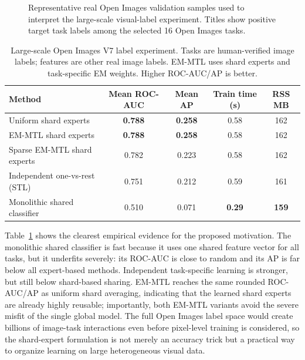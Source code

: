 \documentclass[preprint,12pt]{elsarticle}
\begin{document}
	\begin{figure}[t]
		\centering
		\caption{Representative real Open Images validation samples used to
			interpret the large-scale visual-label experiment. Titles show
			positive target task labels among the selected 16 Open Images tasks.}
		\label{fig:openimages_examples}
	\end{figure}

	\begin{table}[t]
		\centering
		\caption{Large-scale Open Images V7 label experiment. Tasks are
			human-verified image labels; features are other real image labels.
			EM-MTL uses shard experts and task-specific EM weights. Higher
			ROC-AUC/AP is better.}
		\label{tab:openimages_scalability}
		\begin{tabular}{lcccc}
			\toprule
			Method & Mean ROC-AUC & Mean AP & Train time (s) & RSS MB \\
			\midrule
			Uniform shard experts & \textbf{0.788} & \textbf{0.258} & 0.58 & 162 \\
			EM-MTL shard experts & \textbf{0.788} & \textbf{0.258} & 0.58 & 162 \\
			Sparse EM-MTL shard experts & 0.782 & 0.223 & 0.58 & 162 \\
			Independent one-vs-rest (STL) & 0.751 & 0.212 & 0.59 & 161 \\
			Monolithic shared classifier & 0.510 & 0.071 & \textbf{0.29} & \textbf{159} \\
			\bottomrule
		\end{tabular}
	\end{table}

	Table~\ref{tab:openimages_scalability} shows the clearest empirical
	evidence for the proposed motivation. The monolithic shared classifier
	is fast because it uses one shared feature vector for all tasks, but it
	underfits severely: its ROC-AUC is close to random and its AP is far
	below all expert-based methods. Independent task-specific learning is
	stronger, but still below shard-based sharing. EM-MTL reaches the same
	rounded ROC-AUC/AP as uniform shard averaging, indicating that the
	learned shard experts are already highly reusable; importantly, both
	EM-MTL variants avoid the severe misfit of the single global model.
	The full Open Images label space would create billions of image-task
	interactions even before pixel-level training is considered, so the
	shard-expert formulation is not merely an accuracy trick but a practical
	way to organize learning on large heterogeneous visual data.
\end{document}

